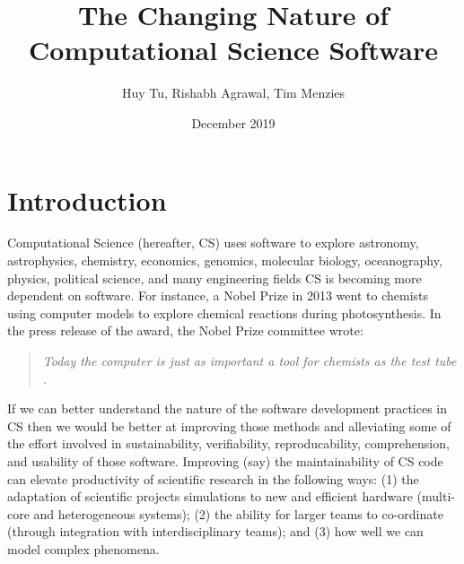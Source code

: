 \documentclass[sigconf,review,anonymous]{acmart}
\title[Changing  Nature of CS Software]{The Changing Nature of Computational Science Software}
\author{Huy Tu, Rishabh Agrawal, Tim Menzies}
\affiliation{ Computer Science, NC State, USA} \email{hqtu@ncsu.edu,  ragrawa3@ncsu.edu, timm@ieee.org}
\date{December 2019}
\newcommand{\bi}{\begin{itemize}}
\newcommand{\ei}{\end{itemize}}
\begin{document}
\maketitle
\section{Introduction}

Computational Science (hereafter, CS)
uses software   to explore
 astronomy, astrophysics, chemistry, economics, genomics, molecular biology, oceanography, physics, political science,  and many   engineering fields 
CS is becoming more dependent on software. For instance, a Nobel Prize in 2013 went to chemists using computer models to explore chemical reactions during photosynthesis. In the press release of the award, the Nobel Prize committee wrote:
\begin{quote}
{\em Today the computer is just as important a tool for chemists as the test tube \cite{nobel_2013}.}
\end{quote}

If we can better understand the nature of the
software development practices in CS
then we would be better at improving those methods and alleviating some of the effort involved in sustainability, verifiability, reproducability, comprehension, and usability of those software.
Improving (say) the 
 maintainability of CS code
 can elevate productivity of scientific research in the following ways: 
(1) the adaptation of scientific projects simulations to new and efficient hardware  (multi-core and heterogeneous systems); (2) the ability for larger teams to co-ordinate (through integration with interdisciplinary teams); and (3) how well we can model complex phenomena. 
 
\end{document}
